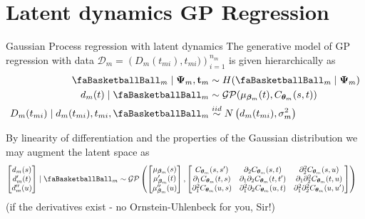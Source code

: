 \documentclass[ignorenonframetext,xcolor=pdflatex,table,dvipsnames,serif]{beamer}
\newcommand{\BTheta}{\text{\faBasketballBall}}
\begin{document}
\section{Latent dynamics GP Regression}
\begin{frame}{Gaussian Process regression with latent dynamics}
The generative model of GP regression with data $\mathcal{D}_m = \left(D_m(t_{mi}), t_{mi})\right)_{i=1}^{n_m}$ is given hierarchically as
\begin{align*}
\begin{split}
  \BTheta_m \mid \bm{\Psi}_m, \mathbf{t}_m &\sim H(\BTheta_m \mid \bm{\Psi}_m)\\
  d_m(t) \mid \BTheta_m &\sim \mathcal{GP}(\mu_{\bm{\beta}_m}(t), C_{\bm{\theta}_m}(s, t))\\
  D_m(t_{mi}) \mid d_m(t_{mi}), t_{mi}, \BTheta_m &\overset{iid}{\sim} N\left(d_m(t_{mi}), \sigma_{m}^2\right)
\end{split}
\end{align*}

\pause
By linearity of differentiation and the properties of the Gaussian distribution we may augment the latent space as
{
\scriptsize
\begin{align*}
  \begin{bmatrix}d_m(s)\\ d^{\prime}_m(t)\\ d^{\prime\prime}_m(u)\end{bmatrix} \mid \BTheta_m &\sim \mathcal{GP}\left(\begin{bmatrix}\mu_{\bm{\beta}_m}(s)\\ \mu^{\prime}_{\bm{\beta}_m}(t)\\ \mu^{\prime\prime}_{\bm{\beta}_m}(u)\end{bmatrix}, \begin{bmatrix}C_{\bm{\theta}_m}(s, s^\prime) & \partial_2 C_{\bm{\theta}_m}(s, t) & \partial_2^2 C_{\bm{\theta}_m}(s, u)\\ \partial_1 C_{\bm{\theta}_m}(t, s) & \partial_1 \partial_2 C_{\bm{\theta}_m}(t, t^\prime) & \partial_1 \partial_2^2 C_{\bm{\theta}_m}(t, u)\\ \partial_1^2 C_{\bm{\theta}_m}(u, s) & \partial_1^2\partial_2 C_{\bm{\theta}_m}(u, t) & \partial_1^2 \partial_2^2 C_{\bm{\theta}_m}(u, u^\prime)\end{bmatrix}\right)
\end{align*}
}
(if the derivatives exist - no Ornstein-Uhlenbeck for you, Sir!)
\end{frame}
\end{document}
